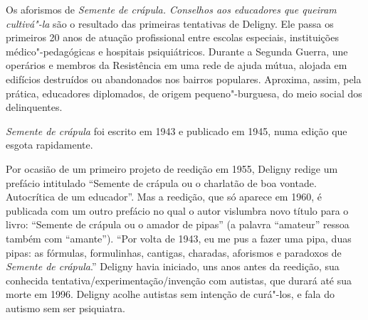 




\pagebreak
\thispagestyle{empty}
\movetooddpage
\thispagestyle{empty}
\setcounter{footnote}{0}
\begin{vplace}[0.25]


{\large{}}
\end{vplace}

\pagebreak
\thispagestyle{empty}

\movetooddpage

Os aforismos de \emph{Semente de crápula. Conselhos aos educadores que
queiram cultivá"-la} são o resultado das primeiras tentativas de Deligny.
Ele passa os primeiros 20 anos de atuação profissional entre escolas
especiais, instituições médico"-pedagógicas e hospitais psiquiátricos.
Durante a Segunda Guerra, une operários e membros da Resistência em uma
rede de ajuda mútua, alojada em edifícios destruídos ou abandonados nos
bairros populares. Aproxima, assim, pela prática, educadores diplomados,
de origem pequeno"-burguesa, do meio social dos delinquentes.

\emph{Semente de crápula} foi escrito em 1943 e publicado em 1945, numa
edição que esgota rapidamente.

Por ocasião de um primeiro projeto de reedição em 1955, Deligny redige
um prefácio intitulado ``Semente de crápula ou o charlatão de boa
vontade. Autocrítica de um educador''. Mas a reedição, que só aparece em
1960, é publicada com um outro prefácio no qual o autor vislumbra novo
título para o livro: ``Semente de crápula ou o amador de pipas'' (a
palavra ``amateur'' ressoa também com ``amante''). ``Por volta de 1943, eu
me pus a fazer uma pipa, duas pipas: as fórmulas, formulinhas, cantigas,
charadas, aforismos e paradoxos de \emph{Semente de crápula}.'' Deligny
havia iniciado, uns anos antes da reedição, sua conhecida
tentativa/experimentação/invenção com autistas, que durará até sua morte
em 1996. Deligny acolhe autistas sem intenção de curá"-los, e fala do
autismo sem ser psiquiatra.

